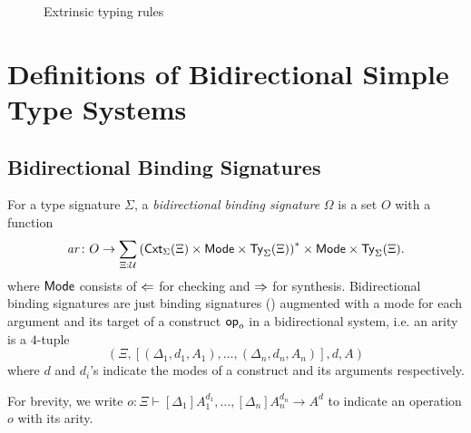 \documentclass[acmsmall,screen]{acmart}
\theoremstyle{acmdefinition}
\begin{document}
\begin{figure}
  \centering
  \small
  \caption{Extrinsic typing rules}
  \label{fig:extrinsic-typing}
\end{figure}

\section{Definitions of Bidirectional Simple Type Systems} 

\subsection{Bidirectional Binding Signatures}

\begin{definition}
  For a type signature $\Sigma$, a \emph{bidirectional binding signature} $\Omega$ is a set $O$ with a function
  \[
    \mathit{ar}\colon O \to \sum_{\Xi : \mathcal{U}} \left(\mathsf{Cxt}_{\Sigma}(\Xi) \times \mathsf{Mode} \times \mathsf{Ty}_{\Sigma}(\Xi)\right)^* \times \mathsf{Mode} \times \mathsf{Ty}_{\Sigma}(\Xi).
  \]
  where $\mathsf{Mode}$ consists of $\Leftarrow$ for checking and $\Rightarrow$ for synthesis.
  Bidirectional binding signatures are just binding signatures () augmented with a mode for each argument and its target of a construct $\mathsf{op}_o$ in a bidirectional system, i.e.
  an arity is a $4$-tuple
  \[
    \left(\Xi, \left[\left(\Delta_1, d_1, A_1\right), \ldots, \left(\Delta_{n}, d_n, A_{n}\right) \right], d, A\right)
  \]
  where $d$ and $d_i$'s indicate the modes of a construct and its arguments respectively.

  For brevity, we write $o \colon \Xi \vdash [\Delta_1]A_{1}^{d_1}, \ldots, [\Delta_{n}] A^{d_n}_{n} \to A^{d}$ to indicate an operation $o$ with its arity. 
\end{definition}
\end{document}
